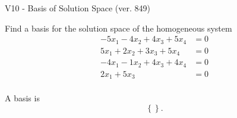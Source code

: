 \begin{exercise}
  \begin{exerciseTitle}V10 - Basis of Solution Space (ver. 849)\end{exerciseTitle}
  \begin{exerciseStatement}
    Find a basis for the solution space of the homogeneous system 
\begin{align*}
 -5 x_ 1 -4 x_ 2 + 4 x_ 3 + 5 x_ 4 &= 0  \\ 
  5 x_ 1 + 2 x_ 2 + 3 x_ 3 + 5 x_ 4 &= 0  \\ 
  -4 x_ 1 -1 x_ 2 + 4 x_ 3 + 4 x_ 4 &= 0  \\ 
  2 x_ 1 + 5 x_ 3 &= 0  \\ 
 \end{align*}


 
  \end{exerciseStatement}

  \begin{exerciseAnswer}
   A basis is   
\[\left\{\right\}.\]

  


  \end{exerciseAnswer}
\end{exercise}